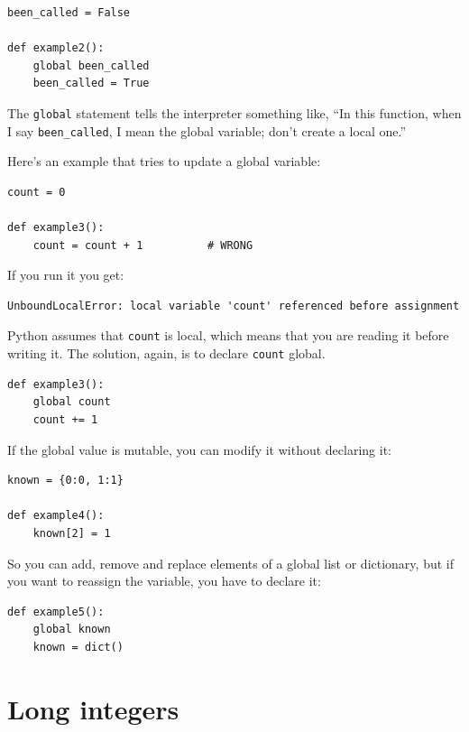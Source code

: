\documentclass[10pt]{book}
\begin{document}
\beforeverb
\begin{verbatim}
been_called = False

def example2():
    global been_called 
    been_called = True
\end{verbatim}
\afterverb
%
The {\tt global} statement tells the interpreter
something like, ``In this function, when I say \verb"been_called", I
mean the global variable; don't create a local one.''


Here's an example that tries to update a global variable:

\beforeverb
\begin{verbatim}
count = 0

def example3():
    count = count + 1          # WRONG
\end{verbatim}
\afterverb
%
If you run it you get:


\beforeverb
\begin{verbatim}
UnboundLocalError: local variable 'count' referenced before assignment
\end{verbatim}
\afterverb
%
Python assumes that {\tt count} is local, which means
that you are reading it before writing it.  The solution, again,
is to declare {\tt count} global.


\beforeverb
\begin{verbatim}
def example3():
    global count
    count += 1
\end{verbatim}
\afterverb
%
If the global value is mutable, you can modify it without
declaring it:


\beforeverb
\begin{verbatim}
known = {0:0, 1:1}

def example4():
    known[2] = 1
\end{verbatim}
\afterverb
%
So you can add, remove and replace elements of a global list or
dictionary, but if you want to reassign the variable, you
have to declare it:

\beforeverb
\begin{verbatim}
def example5():
    global known
    known = dict()
\end{verbatim}
\afterverb
%

\section{Long integers}
\end{document}
